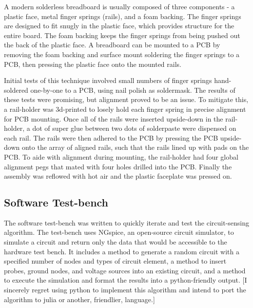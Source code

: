 \documentclass[11pt, a4paper]{article}
\begin{document}
A modern solderless breadboard is usually composed of three components - a plastic face, metal finger springs (rails), and a foam backing.
The finger springs are designed to fit snugly in the plastic face, which provides structure for the entire board.
The foam backing keeps the finger springs from being pushed out the back of the plastic face.
A breadboard can be mounted to a PCB by removing the foam backing and surface mount soldering the finger springs to a PCB, then pressing the plastic face onto the mounted rails.

Initial tests of this technique involved small numbers of finger springs hand-soldered one-by-one to a PCB, using nail polish as soldermask.
The results of these tests were promising, but alignment proved to be an issue.
To mitigate this, a rail-holder was 3d-printed to losely hold each finger spring in precise alignment for PCB mounting.
Once all of the rails were inserted upside-down in the rail-holder, a dot of super glue between two dots of solderpaste were dispensed on each rail.
The rails were then adhered to the PCB by pressing the PCB upside-down onto the array of aligned rails, such that the rails lined up with pads on the PCB. 
To aide with alignment during mounting, the rail-holder had four global alignment pegs that mated with four holes drilled into the PCB.
Finally the assembly was reflowed with hot air and the plastic faceplate was pressed on.


\subsection{Software Test-bench}

The software test-bench was written to quickly iterate and test the circuit-sensing algorithm.
The test-bench uses NGspice, an open-source circuit simulator, to simulate a circuit and return only the data that would be accessible to the hardware test bench.
It includes a method to generate a random circuit with a specified number of nodes and types of circuit element, a method to insert probes, ground nodes, and voltage sources into an existing circuit, and a method to execute the simulation and format the results into a python-friendly output.
[I sincerely regret using python to implement this algorithm and intend to port the algorithm to julia or another, friendlier, language.]
\end{document}
